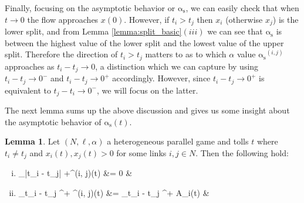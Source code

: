 \documentclass[10pt,a4paper]{book}
\newcommand{\as}{\mathrm{\alpha_s}}
\theoremstyle{definition}
\newtheorem{lemma}[definition]{Lemma}
\theoremstyle{comment}
\begin{document}
Finally, focusing on the asymptotic behavior or $\as$, we can easily check that when $t \rightarrow 0$ the flow approaches $x(0)$.
However, if $t_i > t_j$ then $x_i$ (otherwise $x_j$) is the lower split, and from Lemma \ref{lemma:split_basic}$(iii)$ we can see that $\as$ is between the highest value of the lower split and the lowest value of the upper split.
Therefore the direction of $t_i > t_j$ matters to as to which $\alpha$ value $\as^{(i, j)}$ approaches as $t_i - t_j \rightarrow 0$, a distinction which we can capture by using $t_i - t_j \rightarrow 0^-$ and $t_i - t_j \rightarrow 0^+$ accordingly.
However, since $t_i - t_j \rightarrow 0^+$ is equivalent to $t_j - t_i \rightarrow 0^-$, we will focus on the latter.

The next lemma sums up the above discussion and gives us some insight about the asymptotic behavior of $\as(t)$.
\begin{lemma}
	\label{lemma:split_asymptotic}
	Let $(N, \ell, \alpha)$ a heterogeneous parallel game and tolls $t$ where $t_i \ne t_j$ and $x_i(t), x_j(t) > 0$ for some links $i, j \in N$.
	Then the following hold:
	\begin{enumerate}[(i)]
		\item
		\begin{flalign*}
			\lim_{|t_i - t_j| \rightarrow +\infty}\as^{(i, j)}(t) &= 0 &
		\end{flalign*}
		\item
		\begin{flalign*}
			\lim_{t_i - t_j ^+} \as^{(i, j)}(t) &= \limsup_{t_i - t_j ^+} A_i(t) &
		\end{flalign*}
	\end{enumerate}
\end{lemma}
\end{document}

